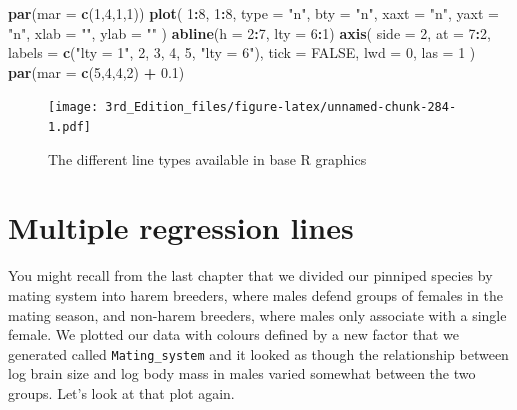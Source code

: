 \documentclass[
]{book}
\newenvironment{Shaded}{\begin{snugshade}}{\end{snugshade}}
\newcommand{\DataTypeTok}[1]{\textcolor[rgb]{0.13,0.29,0.53}{#1}}
\newcommand{\DecValTok}[1]{\textcolor[rgb]{0.00,0.00,0.81}{#1}}
\newcommand{\FloatTok}[1]{\textcolor[rgb]{0.00,0.00,0.81}{#1}}
\newcommand{\KeywordTok}[1]{\textcolor[rgb]{0.13,0.29,0.53}{\textbf{#1}}}
\newcommand{\NormalTok}[1]{#1}
\newcommand{\OperatorTok}[1]{\textcolor[rgb]{0.81,0.36,0.00}{\textbf{#1}}}
\newcommand{\OtherTok}[1]{\textcolor[rgb]{0.56,0.35,0.01}{#1}}
\newcommand{\StringTok}[1]{\textcolor[rgb]{0.31,0.60,0.02}{#1}}
\begin{document}
\begin{Shaded}
\begin{Highlighting}[]
\KeywordTok{par}\NormalTok{(}\DataTypeTok{mar =} \KeywordTok{c}\NormalTok{(}\DecValTok{1}\NormalTok{,}\DecValTok{4}\NormalTok{,}\DecValTok{1}\NormalTok{,}\DecValTok{1}\NormalTok{))}
\KeywordTok{plot}\NormalTok{(}
  \DecValTok{1}\OperatorTok{:}\DecValTok{8}\NormalTok{,}
  \DecValTok{1}\OperatorTok{:}\DecValTok{8}\NormalTok{,}
  \DataTypeTok{type =} \StringTok{"n"}\NormalTok{,}
  \DataTypeTok{bty =} \StringTok{"n"}\NormalTok{,}
  \DataTypeTok{xaxt =} \StringTok{"n"}\NormalTok{,}
  \DataTypeTok{yaxt =} \StringTok{"n"}\NormalTok{,}
  \DataTypeTok{xlab =} \StringTok{""}\NormalTok{,}
  \DataTypeTok{ylab =} \StringTok{""}
\NormalTok{)}
\KeywordTok{abline}\NormalTok{(}\DataTypeTok{h =} \DecValTok{2}\OperatorTok{:}\DecValTok{7}\NormalTok{, }\DataTypeTok{lty =} \DecValTok{6}\OperatorTok{:}\DecValTok{1}\NormalTok{)}
\KeywordTok{axis}\NormalTok{(}
  \DataTypeTok{side =} \DecValTok{2}\NormalTok{,}
  \DataTypeTok{at =} \DecValTok{7}\OperatorTok{:}\DecValTok{2}\NormalTok{,}
  \DataTypeTok{labels =} \KeywordTok{c}\NormalTok{(}\StringTok{"lty = 1"}\NormalTok{, }\DecValTok{2}\NormalTok{, }\DecValTok{3}\NormalTok{, }\DecValTok{4}\NormalTok{, }\DecValTok{5}\NormalTok{, }\StringTok{"lty = 6"}\NormalTok{),}
  \DataTypeTok{tick =} \OtherTok{FALSE}\NormalTok{,}
  \DataTypeTok{lwd =} \DecValTok{0}\NormalTok{,}
  \DataTypeTok{las =} \DecValTok{1}
\NormalTok{)}
\KeywordTok{par}\NormalTok{(}\DataTypeTok{mar =} \KeywordTok{c}\NormalTok{(}\DecValTok{5}\NormalTok{,}\DecValTok{4}\NormalTok{,}\DecValTok{4}\NormalTok{,}\DecValTok{2}\NormalTok{) }\OperatorTok{+}\StringTok{ }\FloatTok{0.1}\NormalTok{)}
\end{Highlighting}
\end{Shaded}

\begin{figure}
\centering
\texttt{[image: 3rd\_Edition\_files/figure-latex/unnamed-chunk-284-1.pdf]}
\caption{\label{fig:unnamed-chunk-284}The different line types available in base R graphics}
\end{figure}

\hypertarget{multiple-regression-lines}{%
\section{Multiple regression lines}\label{multiple-regression-lines}}

You might recall from the last chapter that we divided our pinniped species by mating system into harem breeders, where males defend groups of females in the mating season, and non-harem breeders, where males only associate with a single female. We plotted our data with colours defined by a new factor that we generated called \texttt{Mating\_system} and it looked as though the relationship between log brain size and log body mass in males varied somewhat between the two groups. Let's look at that plot again.
\end{document}
